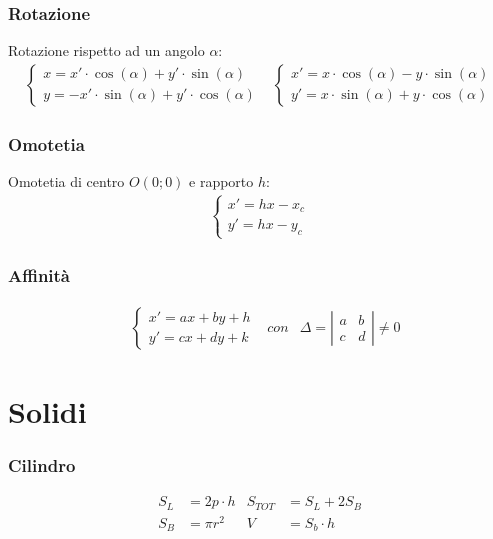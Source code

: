 \documentclass[a4paper]{article}
\begin{document}
	\subsubsection*{Rotazione}
	Rotazione rispetto ad un angolo $\alpha$:
	\begin{align*}
		\begin{cases}
			x=x' \cdot \cos (\alpha) + y' \cdot \sin(\alpha)\\
			y= -x' \cdot \sin (\alpha) + y' \cdot \cos(\alpha)
		\end{cases}&
		\begin{cases}
			x'= x \cdot \cos (\alpha) - y \cdot \sin(\alpha)\\
			y'= x \cdot \sin (\alpha) + y \cdot \cos(\alpha)
		\end{cases}
	\end{align*}
	\subsubsection*{Omotetia}
	Omotetia di centro $O(0;0)$ e rapporto $h$:
		\begin{align*}
	\begin{cases}
	x' = hx - x_c\\
	y' = hx - y_c
	\end{cases}
	\end{align*}
	\subsubsection*{Affinità}
	\begin{align*}
		&\begin{cases}
			x'=ax+by+h\\
			y'=cx+dy+k
		\end{cases}&
		con &\varDelta = \left| \begin{matrix}
		a & b \\ 
		c & d
		\end{matrix}
		\right|\neq 0
	\end{align*}
	
	\newpage
	\section{Solidi}
	\subsubsection*{Cilindro}
	\begin{align*}
		S_L & = 2p \cdot h & S_{TOT} & = S_L + 2S_B  \\
		S_B & = \pi r^2    & V       & = S_b \cdot h
	\end{align*}
	\\
\end{document}
